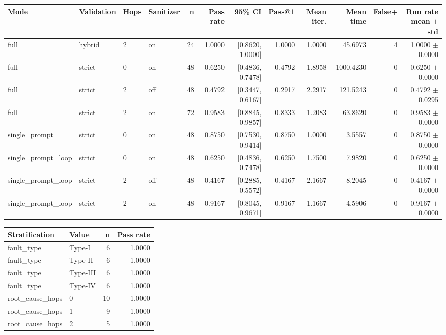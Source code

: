 \begin{table}[ht]
\centering
\begin{tabular}{llllrrrrrrrr}
Mode & Validation & Hops & Sanitizer & n & Pass rate & 95\% CI & Pass@1 & Mean iter. & Mean time & False+ & Run rate mean $\pm$ std \\
\hline
full & hybrid & 2 & on & 24 & 1.0000 & [0.8620, 1.0000] & 1.0000 & 1.0000 & 45.6973 & 4 & 1.0000 $\pm$ 0.0000 \\
full & strict & 0 & on & 48 & 0.6250 & [0.4836, 0.7478] & 0.4792 & 1.8958 & 1000.4230 & 0 & 0.6250 $\pm$ 0.0000 \\
full & strict & 2 & off & 48 & 0.4792 & [0.3447, 0.6167] & 0.2917 & 2.2917 & 121.5243 & 0 & 0.4792 $\pm$ 0.0295 \\
full & strict & 2 & on & 72 & 0.9583 & [0.8845, 0.9857] & 0.8333 & 1.2083 & 63.8620 & 0 & 0.9583 $\pm$ 0.0000 \\
single\_prompt & strict & 0 & on & 48 & 0.8750 & [0.7530, 0.9414] & 0.8750 & 1.0000 & 3.5557 & 0 & 0.8750 $\pm$ 0.0000 \\
single\_prompt\_loop & strict & 0 & on & 48 & 0.6250 & [0.4836, 0.7478] & 0.6250 & 1.7500 & 7.9820 & 0 & 0.6250 $\pm$ 0.0000 \\
single\_prompt\_loop & strict & 2 & off & 48 & 0.4167 & [0.2885, 0.5572] & 0.4167 & 2.1667 & 8.2045 & 0 & 0.4167 $\pm$ 0.0000 \\
single\_prompt\_loop & strict & 2 & on & 48 & 0.9167 & [0.8045, 0.9671] & 0.9167 & 1.1667 & 4.5906 & 0 & 0.9167 $\pm$ 0.0000 \\
\end{tabular}
\end{table}
\begin{table}[ht]
\centering
\begin{tabular}{llrr}
Stratification & Value & n & Pass rate \\
\hline
fault_type & Type-I & 6 & 1.0000 \\
fault_type & Type-II & 6 & 1.0000 \\
fault_type & Type-III & 6 & 1.0000 \\
fault_type & Type-IV & 6 & 1.0000 \\
root_cause_hops & 0 & 10 & 1.0000 \\
root_cause_hops & 1 & 9 & 1.0000 \\
root_cause_hops & 2 & 5 & 1.0000 \\
\end{tabular}
\end{table}
